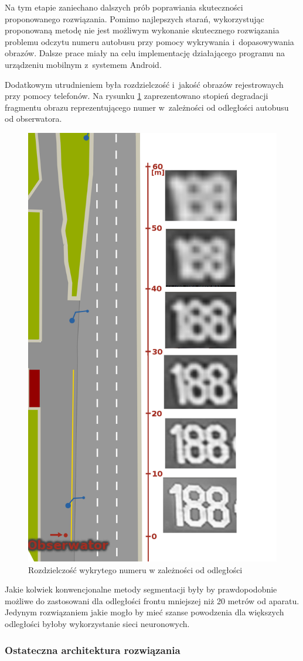 Na tym etapie zaniechano dalszych prób poprawiania skuteczności 
proponowanego rozwiązania. Pomimo najlepszych starań,
wykorzystując proponowaną metodę nie jest możliwym 
wykonanie skutecznego rozwiązania problemu odczytu 
numeru autobusu przy pomocy wykrywania i~dopasowywania obrazów.
Dalsze prace miały na celu implementację działającego programu na 
urządzeniu mobilnym z~systemem Android.

Dodatkowym utrudnieniem była rozdzielczość i~jakość obrazów rejestrowaych
przy pomocy telefonów. Na rysunku \ref{fig:dist2res} zaprezentowano
stopień degradacji fragmentu obrazu reprezentującego numer
w~zależności od odległości autobusu od obserwatora. 

\begin{figure}[!h]
	\centering
	\includegraphics[height=0.9\textwidth]{img/exp_numer_od_odleglosci}
	\caption{Rozdzielczość wykrytego numeru w zależności od odległości}
	\label{fig:dist2res}
\end{figure}

Jakie kolwiek konwencjonalne metody segmentacji były by prawdopodobnie 
możliwe do zastosowani dla odległości frontu mniejszej niż 20 metrów od aparatu.
Jedynym rozwiązaniem jakie mogło by mieć
szanse powodzenia dla większych odległości byłoby wykorzystanie sieci neuronowych. 

\subsubsection{Ostateczna architektura rozwiązania}

